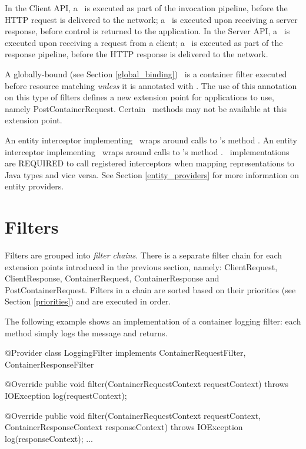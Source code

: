 In the Client API, a \ClientRequestFilter\ is executed as part of the invocation pipeline, before the HTTP request is delivered to the network; a \ClientResponseFilter\ is executed upon receiving a server response, before control is returned to the application. 
In the Server API, a \ContainerRequestFilter\ is executed upon receiving a request from a client; a \ContainerResponseFilter\ is executed as part of the response pipeline, before the HTTP response is delivered to the network. 

A globally-bound (see Section \ref{global_binding}) \ContainerRequestFilter\ is a container filter executed before resource matching {\em unless} it is annotated with \PostMatching. The use of this annotation on this type of filters defines a new extension point for applications to use, namely PostContainerRequest. Certain \ContainerRequestContext\ methods may not be available at this extension point. 

An entity interceptor implementing \ReaderInterceptor\ wraps around calls to 's method . An entity interceptor implementing \WriterInterceptor\ wraps around calls to 's method . \jaxrs\ implementations are REQUIRED to call registered interceptors when mapping representations to Java types and vice versa. See Section \ref{entity_providers} for more information on entity providers.

\section{Filters}
\label{filters}

Filters are grouped into \emph{filter chains}. There is a separate filter chain for each extension points introduced in the previous section, namely: ClientRequest, ClientResponse, ContainerRequest, ContainerResponse and PostContainerRequest. Filters in a chain are sorted based on their priorities (see Section \ref{priorities}) and are executed in order. 

The following example shows an implementation of a container logging filter: each method simply logs the message and returns.

\begin{listing}{1}
@Provider
class LoggingFilter implements ContainerRequestFilter, 
                               ContainerResponseFilter {

    @Override
    public void filter(ContainerRequestContext requestContext) 
        throws IOException {
        log(requestContext);
    }

    @Override
    public void filter(ContainerRequestContext requestContext, 
        ContainerResponseContext responseContext) throws IOException {
        log(responseContext);
    }
    ...
}
\end{listing}

